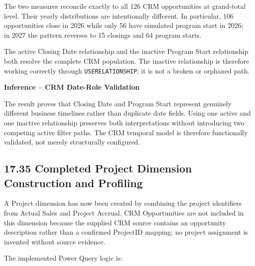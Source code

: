 \documentclass[11pt,a4paper]{article}
\begin{document}
The two measures reconcile exactly to all 126 CRM opportunities at grand-total
level. Their yearly distributions are intentionally different. In particular,
106 opportunities close in 2026 while only 56 have simulated program start in
2026; in 2027 the pattern reverses to 15 closings and 64 program starts.

\begin{successbox}

\textbf{\color{SuccessGreen}{CRM Date-Role Validation Result}}

The active Closing Date relationship and the inactive Program Start relationship
both resolve the complete CRM population. The inactive relationship is therefore
working correctly through \texttt{USERELATIONSHIP}; it is not a broken or
orphaned path.

\end{successbox}

\begin{inferencebox}

\textbf{Inference -- CRM Date-Role Validation}

The result proves that Closing Date and Program Start represent genuinely
different business timelines rather than duplicate date fields. Using one active
and one inactive relationship preserves both interpretations without introducing
two competing active filter paths. The CRM temporal model is therefore
functionally validated, not merely structurally configured.

\end{inferencebox}

\subsection{17.35 Completed Project Dimension Construction and Profiling}

A Project dimension has now been created by combining the project identifiers
from Actual Sales and Project Accrual. CRM Opportunities are not included in
this dimension because the supplied CRM source contains an opportunity
description rather than a confirmed ProjectID mapping; no project assignment is
invented without source evidence.

The implemented Power Query logic is:
\end{document}
